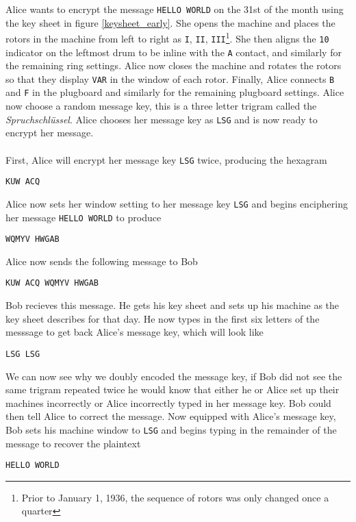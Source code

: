 \noindent Alice wants to encrypt the message \texttt{HELLO WORLD} on
the 31st of the month using the key sheet in figure
\ref{keysheet_early}. She opens the machine and places the rotors in
the machine from left to right as \texttt{I}, \texttt{II},
\texttt{III}\footnote{Prior to January 1, 1936, the sequence of
rotors was only changed once a quarter}. She then aligns the
\texttt{10} indicator on the
leftmost drum to be inline with the \texttt{A} contact, and similarly
for the remaining ring settings. Alice now closes the machine and
rotates the rotors so that they display \texttt{VAR} in the window of
each rotor. Finally, Alice connects \texttt{B} and \texttt{F} in the
plugboard and similarly for the remaining plugboard settings. Alice
now choose a random message key, this is a three letter trigram
called the \emph{Spruchschlüssel}. Alice chooses her message key as
\texttt{LSG} and is now ready to encrypt her message.
\\\\First, Alice will encrypt her message key \texttt{LSG} twice,
producing the hexagram
\begin{center}
  \texttt{KUW ACQ}
\end{center}
\noindent Alice now sets her window setting to her message key
\texttt{LSG} and begins enciphering her message \texttt{HELLO WORLD} to produce
\begin{center}
  \texttt{WQMYV HWGAB}
\end{center}
Alice now sends the following message to Bob
\begin{center}
  \texttt{KUW ACQ WQMYV HWGAB}
\end{center}
\noindent Bob recieves this message. He gets his key sheet and sets
up his machine as the key sheet describes for that day. He now types
in the first six letters of the messsage to get back Alice's message
key, which will look like
\begin{center}
  \texttt{LSG LSG}
\end{center}
We can now see why we doubly encoded the message key, if Bob did not
see the same trigram repeated twice he would know that either he or
Alice set up their machines incorrectly or Alice incorrectly typed in
her message key. Bob could then tell Alice to correct the message.
Now equipped with Alice's message key, Bob sets his machine window to
\texttt{LSG} and begins typing in the remainder of the message to
recover the plaintext
\begin{center}
  \texttt{HELLO WORLD}
\end{center}
